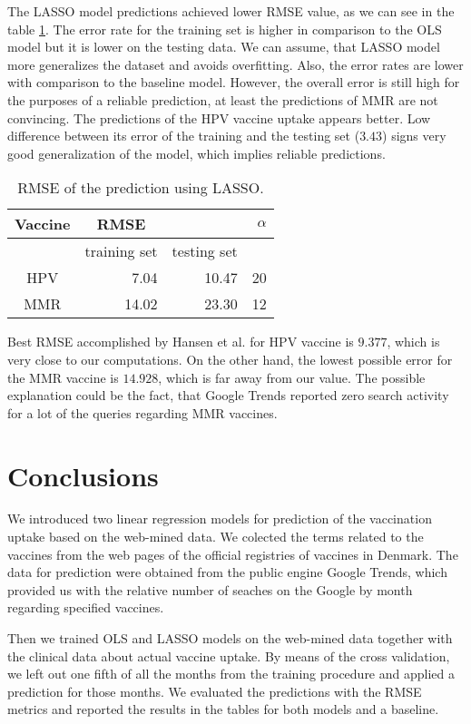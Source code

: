 \documentclass{sig-alternate}
\begin{document}
The LASSO model predictions achieved lower RMSE value, as we can see in the table \ref{lasso}.
The error rate for the training set is higher in comparison to the OLS model but it is lower on the testing data.
We can assume, that LASSO model more generalizes the dataset and avoids overfitting.
Also, the error rates are lower with comparison to the baseline model.
However, the overall error is still high for the purposes of a reliable prediction, at least the predictions of MMR are not convincing.
The predictions of the HPV vaccine uptake appears better.
Low difference between its error of the training and the testing set ($3.43$) signs very good generalization of the model, which implies reliable predictions.


\begin{table}[h]
\centering
\caption{RMSE of the prediction using LASSO.}
\label{lasso}
\begin{tabular}{|c|r|r|r|} \hline
Vaccine& \multicolumn{1}{c}{RMSE}&& $\alpha$\\ \hline
&training set&testing set& \\ \hline
HPV & 7.04 & 10.47 & 20\\ \hline
MMR & 14.02 & 23.30 & 12\\ \hline
\end{tabular}
\end{table}

Best RMSE accomplished by Hansen et al.\cite{H2016} for HPV vaccine is $9.377$, which is very close to our computations.
On the other hand, the lowest possible error for the MMR vaccine is $14.928$, which is far away from our value.
The possible explanation could be the fact, that Google Trends reported zero search activity for a lot of the queries regarding MMR vaccines.

\section{Conclusions}
We introduced two linear regression models for prediction of the vaccination uptake based on the web-mined data.
We colected the terms related to the vaccines from the web pages of the official registries of vaccines in Denmark.
The data for prediction were obtained from the public engine Google Trends, which provided us with the relative number of seaches on the Google by month regarding specified vaccines.

Then we trained OLS and LASSO models on the web-mined data together with the clinical data about actual vaccine uptake.
By means of the cross validation, we left out one fifth of all the months from the training procedure and applied a prediction for those months.
We evaluated the predictions with the RMSE metrics and reported the results in the tables for both models and a baseline.
\end{document}
